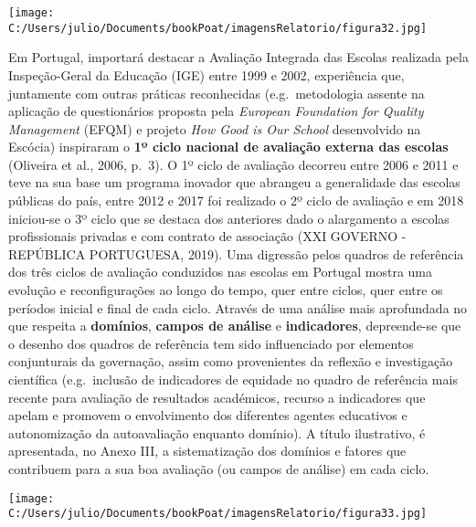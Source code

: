 \documentclass[
]{book}
\begin{document}
\texttt{[image: C:/Users/julio/Documents/bookPoat/imagensRelatorio/figura32.jpg]}

Em Portugal, importará destacar a Avaliação Integrada das Escolas realizada pela Inspeção-Geral da Educação (IGE) entre 1999 e 2002, experiência que, juntamente com outras práticas reconhecidas (e.g.~metodologia assente na aplicação de questionários proposta pela \emph{European Foundation for Quality Management} (EFQM) e projeto \emph{How Good is Our School} desenvolvido na Escócia) inspiraram o \textbf{1º ciclo nacional de avaliação externa das escolas} (Oliveira et al., 2006, p.~3). O 1º ciclo de avaliação decorreu entre 2006 e 2011 e teve na sua base um programa inovador que abrangeu a generalidade das escolas públicas do país, entre 2012 e 2017 foi realizado o 2º ciclo de avaliação e em 2018 iniciou-se o 3º ciclo que se destaca dos anteriores dado o alargamento a escolas profissionais privadas e com contrato de associação (XXI GOVERNO - REPÚBLICA PORTUGUESA, 2019). Uma digressão pelos quadros de referência dos três ciclos de avaliação conduzidos nas escolas em Portugal mostra uma evolução e reconfigurações ao longo do tempo, quer entre ciclos, quer entre os períodos inicial e final de cada ciclo. Através de uma análise mais aprofundada no que respeita a \textbf{domínios}, \textbf{campos de análise} e \textbf{indicadores}, depreende-se que o desenho dos quadros de referência tem sido influenciado por elementos conjunturais da governação, assim como provenientes da reflexão e investigação científica (e.g.~inclusão de indicadores de equidade no quadro de referência mais recente para avaliação de resultados académicos, recurso a indicadores que apelam e promovem o envolvimento dos diferentes agentes educativos e autonomização da autoavaliação enquanto domínio). A título ilustrativo, é apresentada, no Anexo III, a sistematização dos domínios e fatores que contribuem para a sua boa avaliação (ou campos de análise) em cada ciclo.

\texttt{[image: C:/Users/julio/Documents/bookPoat/imagensRelatorio/figura33.jpg]}
\end{document}

